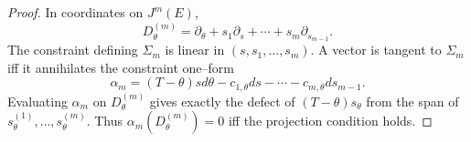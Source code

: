 \documentclass[10pt,a4paper]{amsart}
\begin{document}
\begin{proof}
In coordinates on $J^m(E)$,
\[
D_\theta^{(m)}=
\partial_\theta +
s_1\partial_s +
\cdots +
s_m\partial_{s_{m-1}}.
\]
The constraint defining $\Sigma_m$ is linear in $(s,s_1,\dots,s_m)$.  A
vector is tangent to $\Sigma_m$ iff it annihilates the constraint
one--form
\[
\alpha_m
=
(T-\theta)sd\theta - c_{1,\theta}ds - \cdots - c_{m,\theta}ds_{m-1}.
\]
Evaluating $\alpha_m$ on $D_\theta^{(m)}$ gives exactly the defect of
$(T-\theta)s_\theta$ from the span of $s_\theta^{(1)},\dots,s_\theta^{(m)}$.
Thus $\alpha_m(D_\theta^{(m)})=0$ iff the projection condition holds.
\end{proof}
\end{document}
